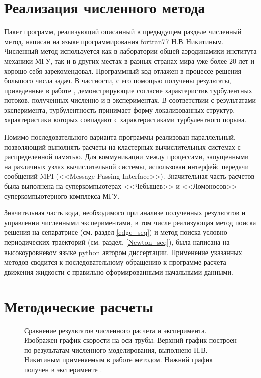 \section{Реализация численного метода}

Пакет программ, реализующий описанный в предыдущем разделе численный метод, написан на языке программирования fortran77 Н.В.\,Никитиным. Численный метод используется как в лаборатории общей аэродинамики института механики МГУ, так и в других местах в разных странах мира уже более 20 лет и хорошо себя зарекомендовал. Программный код отлажен в процессе решения большого числа задач. В частности, с его помощью получены результаты, приведенные в работе \cite{Nikitin2006}, демонстрирующие согласие характеристик турбулентных потоков, полученных численно и в экспериментах. В соответствии с результатами эксперимента, турбулентность принимает форму локализованных структур, характеристики которых совпадают с характеристиками турбулентного порыва.

Помимо последовательного варианта программы реализован параллельный, позволяющий выполнять расчеты на кластерных вычислительных системах с распределенной памятью. Для коммуникации между процессами, запущенными на различных узлах вычислительной системы, использован интерфейс передачи сообщений MPI (<<Message Passing Interface>>). Значительная часть расчетов была выполнена на суперкомпьютерах <<Чебышев>> и <<Ломоносов>> суперкомпьютерного комплекса МГУ. 

Значительная часть кода, необходимого при анализе полученных результатов и управлении численными экспериментами, в том числе реализующая метод поиска решения на сепаратрисе (см. раздел \ref{edge_seq}) и метод поиска условно периодических траекторий (см. раздел. \ref{Newton_seq}), была написана на высокоуровневом языке python автором диссертации. Применение указанных методов сводится к последовательному обращению к программе расчета движения жидкости с правильно сформированными начальными данными. 


\section{Методические расчеты} \label{puff_calc}

\begin{figure}[h]
\caption{Сравнение результатов численного расчета и эксперимента. Изображен график скорости на оси трубы. Верхний график построен по результатам численного моделирования, выполнено Н.В. Никитиным применяемым в работе методом. Нижний график получен в эксперименте \cite{Wygnanski1973}.}
\label{exper_img}
\end{figure}

